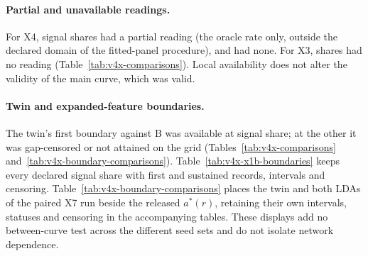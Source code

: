 \paragraph{Partial and unavailable readings.}
For X4,  signal shares had a partial reading (the oracle rate only, outside the declared domain of the fitted-panel procedure), and  had none. For X3,  shares had no reading (Table~\ref{tab:v4x-comparisons}). Local availability does not alter the validity of the main curve, which was valid.

\paragraph{Twin and expanded-feature boundaries.}
The twin's first boundary against B was available at  signal share; at the other  it was gap-censored or not attained on the grid (Tables~\ref{tab:v4x-comparisons} and~\ref{tab:v4x-boundary-comparisons}). Table~\ref{tab:v4x-x1b-boundaries} keeps every declared signal share with first and sustained records, intervals and censoring. Table~\ref{tab:v4x-boundary-comparisons} places the twin and both LDAs of the paired X7 run beside the released $a^*(r)$, retaining their own intervals, statuses and censoring in the accompanying tables. These displays add no between-curve test across the different seed sets and do not isolate network dependence.

